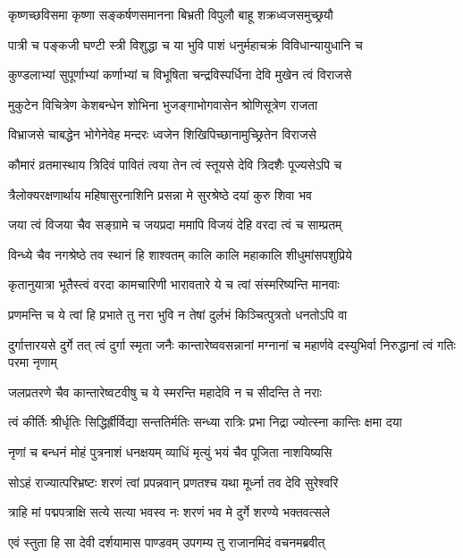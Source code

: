 \twolineshloka
{कृष्णच्छविसमा कृष्णा सङ्कर्षणसमानना}
{बिभ्रती विपुलौ बाहू शक्रध्वजसमुच्छ्रयौ}


\twolineshloka
{पात्री च पङ्कजी घण्टी स्त्री विशुद्धा च या भुवि}
{पाशं धनुर्महाचक्रं विविधान्यायुधानि च}


\twolineshloka
{कुण्डलाभ्यां सुपूर्णाभ्यां कर्णाभ्यां च विभूषिता}
{चन्द्रविस्पर्धिना देवि मुखेन त्वं विराजसे}


\twolineshloka
{मुकुटेन विचित्रेण केशबन्धेन शोभिना}
{भुजङ्गाभोगवासेन श्रोणिसूत्रेण राजता}


\twolineshloka
{विभ्राजसे चाबद्धेन भोगेनेवेह मन्दरः}
{ध्वजेन शिखिपिच्छानामुच्छ्रितेन विराजसे}


\twolineshloka
{कौमारं व्रतमास्थाय त्रिदिवं पावितं त्वया}
{तेन त्वं स्तूयसे देवि त्रिदशैः पूज्यसेऽपि च}


\twolineshloka
{त्रैलोक्यरक्षणार्थाय महिषासुरनाशिनि}
{प्रसन्ना मे सुरश्रेष्ठे दयां कुरु शिवा भव}


\twolineshloka
{जया त्वं विजया चैव सङ्ग्रामे च जयप्रदा}
{ममापि विजयं देहि वरदा त्वं च साम्प्रतम्}


\twolineshloka
{विन्ध्ये चैव नगश्रेष्ठे तव स्थानं हि शाश्वतम्}
{कालि कालि महाकालि शीधुमांसपशुप्रिये}


\twolineshloka
{कृतानुयात्रा भूतैस्त्वं वरदा कामचारिणी}
{भारावतारे ये च त्वां संस्मरिष्यन्ति मानवाः}


\twolineshloka
{प्रणमन्ति च ये त्वां हि प्रभाते तु नरा भुवि}
{न तेषां दुर्लभं किञ्चित्पुत्रतो धनतोऽपि वा}


\threelineshloka
{दुर्गात्तारयसे दुर्गे तत् त्वं दुर्गा स्मृता जनैः}
{कान्तारेष्ववसन्नानां मग्नानां च महार्णवे}
{दस्युभिर्वा निरुद्धानां त्वं गतिः परमा नृणाम्}


\twolineshloka
{जलप्रतरणे चैव कान्तारेष्वटवीषु च}
{ये स्मरन्ति महादेवि न च सीदन्ति ते नराः}


\twolineshloka
{त्वं कीर्तिः श्रीर्धृतिः सिद्धिर्ह्रीर्विद्या सन्ततिर्मतिः}
{सन्ध्या रात्रिः प्रभा निद्रा ज्योत्स्ना कान्तिः क्षमा दया}


\twolineshloka
{नृणां च बन्धनं मोहं पुत्रनाशं धनक्षयम्}
{व्याधिं मृत्युं भयं चैव पूजिता नाशयिष्यसि}


\twolineshloka
{सोऽहं राज्यात्परिभ्रष्टः शरणं त्वां प्रपन्नवान्}
{प्रणतश्च यथा मूर्ध्ना तव देवि सुरेश्वरि}


\twolineshloka
{त्राहि मां पद्मपत्राक्षि सत्ये सत्या भवस्व नः}
{शरणं भव मे दुर्गे शरण्ये भक्तवत्सले}


\twolineshloka
{एवं स्तुता हि सा देवी दर्शयामास पाण्डवम्}
{उपगम्य तु राजानमिदं वचनमब्रवीत्}


